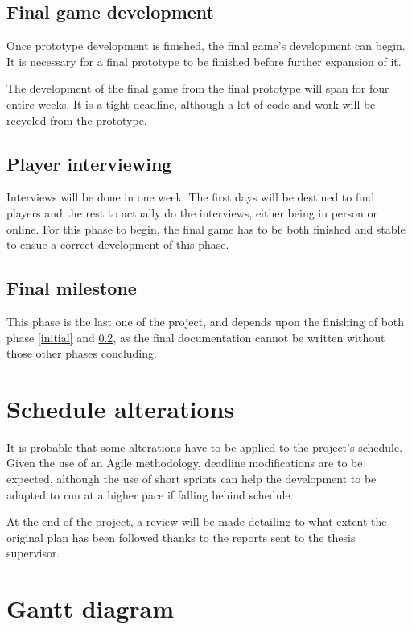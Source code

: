 \subsection{Final game development}

Once prototype development is finished, the final game's development can begin. It is necessary for a final prototype to be finished before further expansion of it.

The development of the final game from the final prototype will span for four entire weeks. It is a tight deadline, although a lot of code and work will be recycled from the prototype.

\subsection{Player interviewing}\label{playerint}

Interviews will be done in one week. The first days will be destined to find players and the rest to actually do the interviews, either being in person or online. For this phase to begin, the final game has to be both finished and stable to ensue a correct development of this phase. 

\subsection{Final milestone}

This phase is the last one of the project, and depends upon the finishing of both phase \ref{initial} and \ref{playerint}, as the final documentation cannot be written without those other phases concluding.

\section{Schedule alterations}

It is probable that some alterations have to be applied to the project's schedule. Given the use of an Agile methodology, deadline modifications are to be expected, although the use of short sprints can help the development to be adapted to run at a higher pace if falling behind schedule.

At the end of the project, a review will be made detailing to what extent the original plan has been followed thanks to the reports sent to the thesis supervisor.

\section{Gantt diagram}

